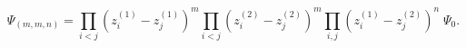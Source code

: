 \begin{equation}
\Psi_{(m,m,n)}=
\prod_{i<j} (z_i^{(1)}-z_j^{(1)})^{m}
\prod_{i<j} (z_i^{(2)}-z_j^{(2)})^{m}
\prod_{i,j} (z_i^{(1)}-z_j^{(2)})^{n} \; \Psi_{0}.
\end{equation}

